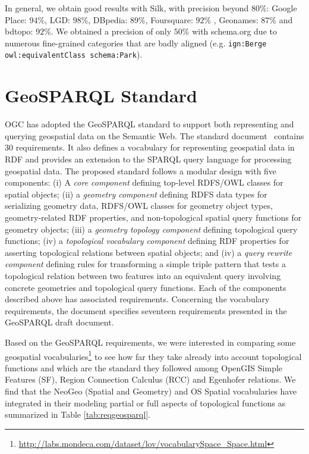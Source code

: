 \documentclass[a4paper,11pt]{report}
\begin{document}
In general, we obtain good results with Silk, with precision beyond $80$\%: Google Place: $94$\%, LGD: $98$\%, DBpedia: $89$\%, Foursquare: $92$\% , Geonames: $87$\% and bdtopo: $92$\%. We obtained a precision of only $50$\% with schema.org due to numerous fine-grained categories that are badly aligned (e.g. \texttt{ign:Berge owl:equivalentClass schema:Park}).



\section{GeoSPARQL Standard}
OGC has adopted the GeoSPARQL standard to support both representing and querying geospatial data on the Semantic Web. The standard document~\cite{ogc2012} contains 30 requirements. It also defines a vocabulary for representing geospatial data in RDF and provides an extension to the SPARQL query language for processing geospatial data. The proposed standard follows a modular design with five components: (i) A \textit{core component} defining top-level RDFS/OWL classes for spatial objects; (ii) a \textit{geometry component} defining RDFS data types for serializing geometry data, RDFS/OWL classes for geometry object types, geometry-related RDF properties, and non-topological spatial query functions for geometry objects; (iii) a \textit{geometry topology component} defining topological query functions; (iv) a \textit{topological vocabulary component} defining RDF properties for asserting topological relations between spatial objects; and (iv) a \textit{query rewrite component} defining rules for transforming a simple triple pattern that tests a topological relation between two features into an equivalent query involving concrete geometries and topological query functions. Each of the components described above has associated requirements. Concerning the vocabulary requirements, the document specifies seventeen requirements presented in the GeoSPARQL draft document.


Based on the GeoSPARQL requirements, we were interested in comparing some geospatial vocabularies\footnote{\url{http://labs.mondeca.com/dataset/lov/vocabularySpace_Space.html}} to see how far they take already into account topological functions and which are the standard they followed among OpenGIS Simple Features (SF), Region Connection Calculus (RCC) and Egenhofer relations. We find that the NeoGeo (Spatial and Geometry) and OS Spatial vocabularies have integrated in their modeling partial or full aspects of topological functions as summarized in Table \ref{tab:reqgeosparql}.
\end{document}
